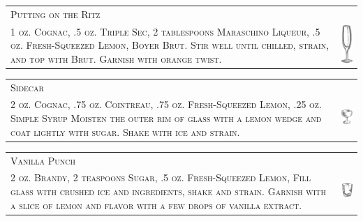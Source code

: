 \documentclass{article}
\begin{document}
\begin{tabular}{b{2.5in} m{0.625in}}
  \multicolumn{2}{p{3.5in}}{\centering\Huge\textsc{Putting on the Ritz}} \\ 
  
  \textsc{1 oz. Cognac, .5 oz. Triple Sec, 2 tablespoons Maraschino
    Liqueur, .5 oz. Fresh-Squeezed Lemon, Boyer Brut. Stir well until
    chilled, strain, and top with Brut. Garnish with orange twist.} &
  \includegraphics[width=0.5in]{flute.png}
\end{tabular}

\begin{tabular}{b{2.5in} m{0.625in}}
  \multicolumn{2}{p{3.5in}}{\centering\Huge\textsc{Sidecar}} \\ 
  
  \textsc{2 oz. Cognac, .75 oz. Cointreau, .75 oz.  Fresh-Squeezed
    Lemon, .25 oz. Simple Syrup Moisten the outer rim of glass with a
    lemon wedge and coat lightly with sugar. Shake with ice and
    strain.} & \includegraphics[width=0.5in]{coupe.png}
\end{tabular}

\begin{tabular}{b{2.5in} m{0.625in}}
  \multicolumn{2}{p{3.5in}}{\centering\Huge\textsc{Vanilla Punch}} \\ 
  
  \textsc{2 oz. Brandy, 2 teaspoons Sugar, .5 oz. Fresh-Squeezed
    Lemon, Fill glass with crushed ice and ingredients, shake and
    strain. Garnish with a slice of lemon and flavor with a few drops
    of vanilla extract.} & \includegraphics[width=0.5in]{rocks_glass.png}
\end{tabular}
\end{document}
